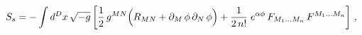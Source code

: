 \begin{equation}
    \label{eq:EFbulkaction}
    S_s = - \int d^Dx \, \sqrt{- g} \left[ \frac12 \, g^{MN} \Bigl(
    R_{MN} + \partial_M \, \phi \, \partial_N \, \phi \Bigr) + {1
    \over 2 \, n!} \;e^{\alpha \phi} \, F_{M_1...M_n} \, F^{M_1...M_n}
    \right]\,,
\end{equation}

